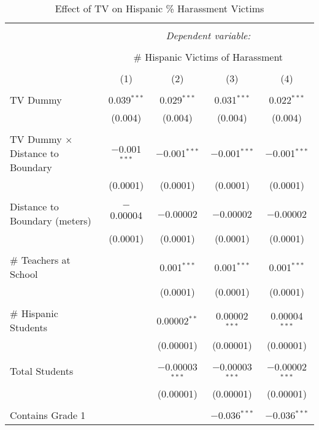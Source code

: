 
\begin{table}[!htbp] \centering 
  \caption{Effect of TV on Hispanic \% Harassment Victims} 
  \label{} 
\begin{tabular}{@{\extracolsep{-2pt}}lcccc} 
\\[-1.8ex]\hline 
\hline \\[-1.8ex] 
 & \multicolumn{4}{c}{\textit{Dependent variable:}} \\ 
\cline{2-5} 
\\[-1.8ex] & \multicolumn{4}{c}{\# Hispanic Victims of Harassment} \\ 
\\[-1.8ex] & (1) & (2) & (3) & (4)\\ 
\hline \\[-1.8ex] 
 TV Dummy & 0.039$^{***}$ & 0.029$^{***}$ & 0.031$^{***}$ & 0.022$^{***}$ \\ 
  & (0.004) & (0.004) & (0.004) & (0.004) \\ 
  & & & & \\ 
 TV Dummy $\times$ Distance to Boundary & $-$0.001$^{***}$ & $-$0.001$^{***}$ & $-$0.001$^{***}$ & $-$0.001$^{***}$ \\ 
  & (0.0001) & (0.0001) & (0.0001) & (0.0001) \\ 
  & & & & \\ 
 Distance to Boundary (meters) & $-$0.00004 & $-$0.00002 & $-$0.00002 & $-$0.00002 \\ 
  & (0.0001) & (0.0001) & (0.0001) & (0.0001) \\ 
  & & & & \\ 
 \# Teachers at School &  & 0.001$^{***}$ & 0.001$^{***}$ & 0.001$^{***}$ \\ 
  &  & (0.0001) & (0.0001) & (0.0001) \\ 
  & & & & \\ 
 \# Hispanic Students &  & 0.00002$^{**}$ & 0.00002$^{***}$ & 0.00004$^{***}$ \\ 
  &  & (0.00001) & (0.00001) & (0.00001) \\ 
  & & & & \\ 
 Total Students &  & $-$0.00003$^{***}$ & $-$0.00003$^{***}$ & $-$0.00002$^{***}$ \\ 
  &  & (0.00001) & (0.00001) & (0.00001) \\ 
  & & & & \\ 
 Contains Grade 1 &  &  & $-$0.036$^{***}$ & $-$0.036$^{***}$ \\ 

\end{tabular}
\end{table}
